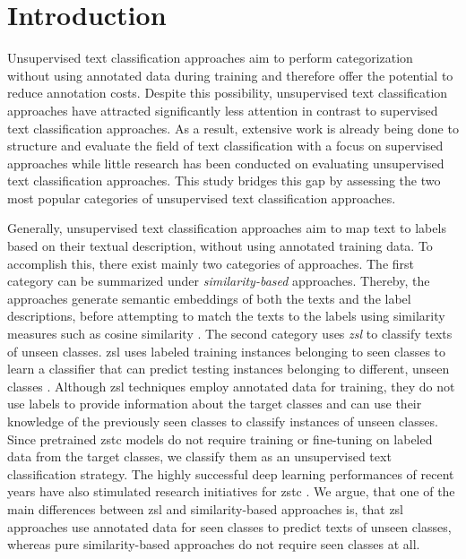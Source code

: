 \documentclass[sigconf]{acmart}
\begin{document}
\section{Introduction}

Unsupervised text classification approaches aim to perform categorization without using annotated data during training and therefore offer the potential to reduce annotation costs. Despite this possibility, unsupervised text classification approaches have attracted significantly less attention in contrast to supervised text classification approaches. As a result, extensive work is already being done to structure and evaluate the field of text classification with a focus on supervised approaches \cite{MIRONCZUK201836, Kadhim2019, info10040150, 10.1145/3439726} while little research has been conducted on evaluating unsupervised text classification approaches. This study bridges this gap by assessing the two most popular categories of unsupervised text classification approaches.



Generally, unsupervised text classification approaches aim to map text to labels based on their textual description, without using annotated training data. To accomplish this, there exist mainly two categories of approaches. The first category can be summarized under \textit{similarity-based} approaches. Thereby, the approaches generate semantic embeddings of both the texts and the label descriptions, before attempting to match the texts to the labels using similarity measures such as cosine similarity \cite{Song_Roth_2014, zero-shot-semsim, haj-yahia-etal-2019-towards, webist21}. The second category uses \textit{\ac{zsl}} to classify texts of unseen classes. \ac{zsl} uses labeled training instances belonging to seen classes to learn a classifier that can predict testing instances belonging to different, unseen classes \cite{10.1145/3293318}. Although \ac{zsl} techniques employ annotated data for training, they do not use labels to provide information about the target classes and can use their knowledge of the previously seen classes to classify instances of unseen classes. Since pretrained \acf{zstc} models do not require training or fine-tuning on labeled data from the target classes, we classify them as an unsupervised text classification strategy. The highly successful deep learning performances of recent years have also stimulated research initiatives for \ac{zstc} \cite{Pushp2017TrainOT, rios-kavuluru-2018-shot, zhang-etal-2019-integrating, yin-etal-2019-benchmarking, 9411914}. We argue, that one of the main differences between \ac{zsl} and similarity-based approaches is, that \ac{zsl} approaches use annotated data for seen classes to predict texts of unseen classes, whereas pure similarity-based approaches do not require seen classes at all.
\end{document}
